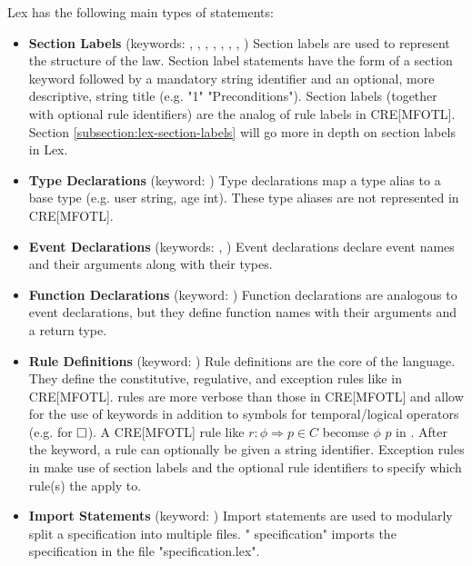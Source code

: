 Lex has the following main types of statements:
\begin{itemize}
    \item \textbf{Section Labels}
        (keywords: , , ,
        , , ,
        , )
        Section labels are used to represent the structure of
        the law.
        Section label statements have the form
        of a section keyword followed by a mandatory string
        identifier and an optional, more descriptive, string
        title (e.g.  "1" "Preconditions").
        Section labels (together with optional rule identifiers)
        are the analog of rule labels in CRE[MFOTL].
        Section \ref{subsection:lex-section-labels} will go
        more in depth on section labels in Lex.
    \item \textbf{Type Declarations}
        (keyword: )
        Type declarations map a type alias to a base type 
        (e.g.  user  string,
         age  int).
        These type aliases are not represented in CRE[MFOTL].
    \item \textbf{Event Declarations}
        (keywords: , )
        Event declarations declare event names and their arguments
        along with their types.
    \item \textbf{Function Declarations}
        (keyword: )
        Function declarations are analogous to event declarations,
        but they define function names with their arguments and a
        return type.
    \item \textbf{Rule Definitions}
        (keyword: )
        Rule definitions are the core of the \Lex language.
        They define the constitutive, regulative, and exception
        rules like in CRE[MFOTL].
        \Lex rules are more verbose than those in CRE[MFOTL]
        and allow for the use of keywords in addition to symbols
        for temporal/logical operators
        (e.g.  for $\operatorname{\square}$).
        A CRE[MFOTL] rule like $r: \phi \Rightarrow p \in C$
        becomse   $\phi$  $p$ in \Lex.
        After the  keyword, a rule can optionally
        be given a string identifier.
        Exception rules in \Lex make use of section labels and
        the optional rule identifiers to specify which rule(s)
        the apply to.
    \item \textbf{Import Statements}
        (keyword: )
        Import statements are used to modularly split
        a \Lex specification into multiple files.
        " specification" imports the
        specification in the file "specification.lex".
\end{itemize}

